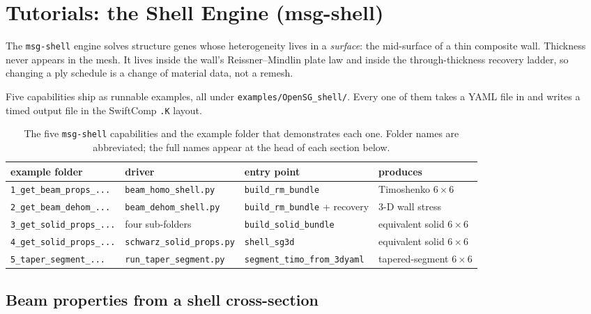 \chapter{Tutorials: the Shell Engine (msg-shell)}
\label{ch:shell}

The \texttt{msg-shell} engine solves structure genes whose heterogeneity lives
in a \emph{surface}: the mid-surface of a thin composite wall. Thickness never
appears in the mesh. It lives inside the wall's Reissner--Mindlin plate law and
inside the through-thickness recovery ladder, so changing a ply schedule is a
change of material data, not a remesh.

Five capabilities ship as runnable examples, all under
\texttt{examples/OpenSG\_shell/}. Every one of them takes a YAML file in and
writes a timed output file in the SwiftComp \texttt{.K} layout.

\begin{table}[htbp]
\centering
\small
\begin{tabular}{llll}
\toprule
example folder & driver & entry point & produces \\
\midrule
\texttt{1\_get\_beam\_props\_...}   & \texttt{beam\_homo\_shell.py}  & \texttt{build\_rm\_bundle}          & Timoshenko $6\times6$ \\
\texttt{2\_get\_beam\_dehom\_...}   & \texttt{beam\_dehom\_shell.py} & \texttt{build\_rm\_bundle} + recovery & 3-D wall stress \\
\texttt{3\_get\_solid\_props\_...}  & four sub-folders               & \texttt{build\_solid\_bundle}       & equivalent solid $6\times6$ \\
\texttt{4\_get\_solid\_props\_...}  & \texttt{schwarz\_solid\_props.py} & \texttt{shell\_sg3d}             & equivalent solid $6\times6$ \\
\texttt{5\_taper\_segment\_...}     & \texttt{run\_taper\_segment.py} & \texttt{segment\_timo\_from\_3dyaml} & tapered-segment $6\times6$ \\
\bottomrule
\end{tabular}
\caption{The five \texttt{msg-shell} capabilities and the example folder that
demonstrates each one. Folder names are abbreviated; the full names appear at
the head of each section below.}
\label{tab:shell-capabilities}
\end{table}

\section{Beam properties from a shell cross-section}
\label{sec:shell-beam}

